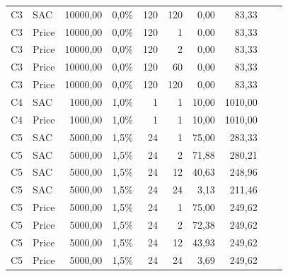 \begin{longtable}{llrrrrrrcc}
C3 & SAC & 10000,00 & 0,0\% & 120 & 120 & 0,00 & 83,33 & & \\
C3 & Price & 10000,00 & 0,0\% & 120 & 1 & 0,00 & 83,33 & & \\
C3 & Price & 10000,00 & 0,0\% & 120 & 2 & 0,00 & 83,33 & & \\
C3 & Price & 10000,00 & 0,0\% & 120 & 60 & 0,00 & 83,33 & & \\
C3 & Price & 10000,00 & 0,0\% & 120 & 120 & 0,00 & 83,33 & & \\
C4 & SAC & 1000,00 & 1,0\% & 1 & 1 & 10,00 & 1010,00 & & \\
C4 & Price & 1000,00 & 1,0\% & 1 & 1 & 10,00 & 1010,00 & & \\
C5 & SAC & 5000,00 & 1,5\% & 24 & 1 & 75,00 & 283,33 & & \\
C5 & SAC & 5000,00 & 1,5\% & 24 & 2 & 71,88 & 280,21 & & \\
C5 & SAC & 5000,00 & 1,5\% & 24 & 12 & 40,63 & 248,96 & & \\
C5 & SAC & 5000,00 & 1,5\% & 24 & 24 & 3,13 & 211,46 & & \\
C5 & Price & 5000,00 & 1,5\% & 24 & 1 & 75,00 & 249,62 & & \\
C5 & Price & 5000,00 & 1,5\% & 24 & 2 & 72,38 & 249,62 & & \\
C5 & Price & 5000,00 & 1,5\% & 24 & 12 & 43,93 & 249,62 & & \\
C5 & Price & 5000,00 & 1,5\% & 24 & 24 & 3,69 & 249,62 & & \\
\hline
\end{longtable}
